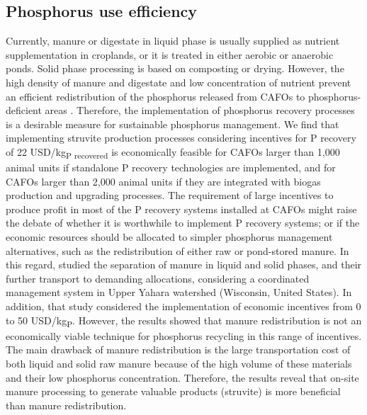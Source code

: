 \begin{refsection}[referencesCh4]
\subsection{Phosphorus use efficiency}
Currently, manure or digestate in liquid phase is usually supplied as nutrient supplementation in croplands, or it is treated in either aerobic or anaerobic ponds. Solid phase processing is based on composting or drying. However, the high density of manure and digestate and low concentration of nutrient prevent an efficient redistribution of the phosphorus released from CAFOs to phosphorus-deficient areas \citep{burns2002phosphorus}. Therefore, the implementation of phosphorus recovery processes 
is a desirable measure for sustainable phosphorus management. We find that implementing struvite production processes considering incentives for P recovery of 22 USD/kg\textsubscript{P recovered} is economically feasible for CAFOs larger than 1,000 animal units if standalone P recovery technologies are implemented, and for CAFOs larger than 2,000 animal units if they are integrated with biogas production and upgrading processes. The requirement of large incentives to produce profit in most of the P recovery systems installed at CAFOs might raise the debate of whether it is worthwhile to implement P recovery systems; or if the economic resources should be allocated to simpler phosphorus management alternatives, such as the redistribution of either raw or pond-stored manure. In this regard, \citet{sampat2019coordinated} studied the separation of manure in liquid and solid phases, and their further transport to demanding allocations, considering a coordinated management system in Upper Yahara watershed (Wisconsin, United States). In addition, that study considered the implementation of economic incentives from 0 to 50 USD/kg\textsubscript{P}. However, the results showed that manure redistribution is not an economically viable technique for phosphorus recycling in this range of incentives. The main drawback of manure redistribution is the large transportation cost of both liquid and solid raw manure because of the high volume of these materials and their low phosphorus concentration. Therefore, the results reveal that on-site manure processing to generate valuable products (struvite) is more beneficial than manure redistribution.


\end{refsection}
